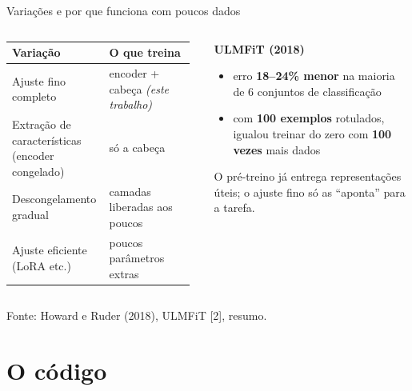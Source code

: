 \documentclass[aspectratio=169,10pt]{beamer}
\newcommand{\fonte}[1]{\par\vfill{\scriptsize\color{tinta2}Fonte: #1}}
\newcommand{\destaque}[1]{{\color{azul}\bfseries #1}}
\begin{document}
\begin{frame}{Variações e por que funciona com poucos dados}
  \begin{columns}[T]
    \begin{column}{0.52\textwidth}
      \small
      \begin{tabular}{@{}L{0.5\linewidth}L{0.46\linewidth}@{}}
        \toprule
        \textbf{Variação} & \textbf{O que treina} \\
        \midrule
        Ajuste fino completo & encoder + cabeça \emph{(este trabalho)} \\
        Extração de características (encoder congelado) & só a cabeça \\
        Descongelamento gradual & camadas liberadas aos poucos \\
        Ajuste eficiente (LoRA etc.) & poucos parâmetros extras \\
        \bottomrule
      \end{tabular}
    \end{column}
    \begin{column}{0.43\textwidth}
      \textbf{ULMFiT (2018)}
      \begin{itemize}
        \item erro \destaque{18--24\% menor} na maioria de 6 conjuntos de classificação
        \item com \destaque{100 exemplos} rotulados, igualou treinar do zero com \destaque{100 vezes} mais dados
      \end{itemize}
      \vspace{0.5em}
      O pré-treino já entrega representações úteis; o ajuste fino só as ``aponta'' para a tarefa.
    \end{column}
  \end{columns}
  \fonte{Howard e Ruder (2018), ULMFiT [2], resumo.}
\end{frame}


\section{O código}
\end{document}

